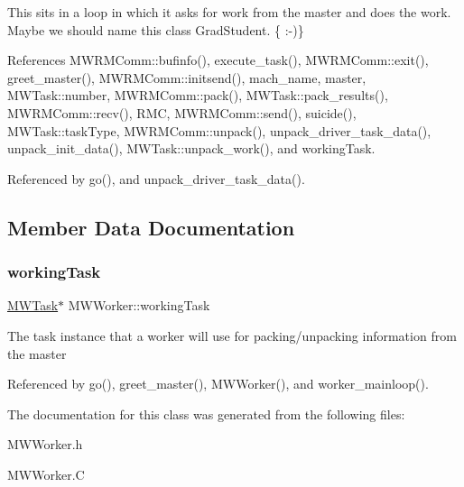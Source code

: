 This sits in a loop in which it asks for work from the master and does the work. Maybe we should name this class Grad\+Student. \{ \+:-\/)\} 

References M\+W\+R\+M\+Comm\+::bufinfo(), execute\+\_\+task(), M\+W\+R\+M\+Comm\+::exit(), greet\+\_\+master(), M\+W\+R\+M\+Comm\+::initsend(), mach\+\_\+name, master, M\+W\+Task\+::number, M\+W\+R\+M\+Comm\+::pack(), M\+W\+Task\+::pack\+\_\+results(), M\+W\+R\+M\+Comm\+::recv(), R\+MC, M\+W\+R\+M\+Comm\+::send(), suicide(), M\+W\+Task\+::task\+Type, M\+W\+R\+M\+Comm\+::unpack(), unpack\+\_\+driver\+\_\+task\+\_\+data(), unpack\+\_\+init\+\_\+data(), M\+W\+Task\+::unpack\+\_\+work(), and working\+Task.



Referenced by go(), and unpack\+\_\+driver\+\_\+task\+\_\+data().



\subsection{Member Data Documentation}
\mbox{\label{classMWWorker_acbd928ad8c2d7a66b9077d5127408bed}} 
\subsubsection{\texorpdfstring{working\+Task}{workingTask}}
{\footnotesize\ttfamily \hyperlink{classMWTask}{M\+W\+Task}$\ast$ M\+W\+Worker\+::working\+Task\hspace{0.3cm}{\ttfamily [protected]}}

The task instance that a worker will use for packing/unpacking information from the master 

Referenced by go(), greet\+\_\+master(), M\+W\+Worker(), and worker\+\_\+mainloop().



The documentation for this class was generated from the following files\+:\begin{DoxyCompactItemize}
\item 
M\+W\+Worker.\+h\item 
M\+W\+Worker.\+C\end{DoxyCompactItemize}
